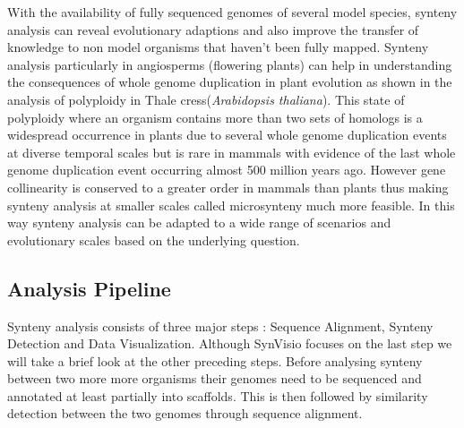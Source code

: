 With the availability of fully sequenced genomes of several model species, synteny analysis can reveal evolutionary adaptions and also improve the transfer of knowledge to non model organisms that haven't been fully mapped\cite{zhao2019network}. Synteny analysis particularly in angiosperms (flowering plants) can help in understanding the consequences of whole genome duplication in plant evolution\cite{adams2005polyploidy} as shown in the analysis of polyploidy in Thale cress(\textit{Arabidopsis thaliana})\cite{seoighe2003turning}. This state of polyploidy where an organism contains more than two sets of homologs is a widespread occurrence in plants  due to several whole genome duplication events at diverse temporal scales but is rare in mammals with evidence of the last whole genome duplication event occurring almost 500 million years ago\cite{adams2005polyploidy,panopoulou2005timing}. However gene collinearity is conserved to a greater order in mammals than plants thus making synteny analysis at smaller scales called microsynteny much more feasible\cite{zhao2019network}. In this way synteny analysis can be adapted to a wide range of scenarios and evolutionary scales based on the underlying question.

\subsection{Analysis Pipeline}

Synteny analysis consists of three major steps : Sequence Alignment, Synteny Detection and Data Visualization. Although SynVisio focuses on the last step we will take a brief look at the other preceding steps. Before analysing synteny between two more more organisms their genomes need to be sequenced and annotated at least partially into scaffolds. This is then followed by similarity detection between the two genomes through sequence alignment.

